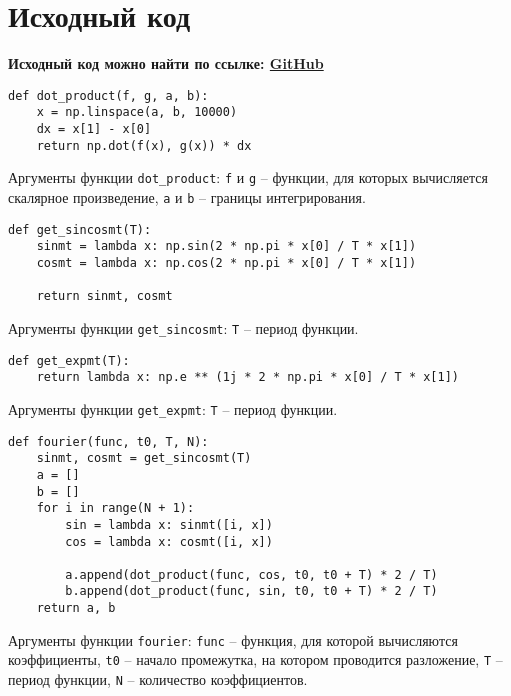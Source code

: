 \section{Исходный код}
\label{appendix:source}

\textbf{Исходный код можно найти по ссылке: \href{https://github.com/edelwiw/Frequency_methods}{GitHub}} 

\begin{lstlisting}[style=python_white, caption=Функция для вычисления скалярного произведения функций, label=lst:dot_product]
def dot_product(f, g, a, b):
    x = np.linspace(a, b, 10000)
    dx = x[1] - x[0]
    return np.dot(f(x), g(x)) * dx
\end{lstlisting}
Аргументы функции \texttt{dot\_product}: \texttt{f} и \texttt{g} -- функции, для которых вычисляется скалярное произведение, \texttt{a} и \texttt{b} -- границы интегрирования.
\newline

\begin{lstlisting}[style=python_white, caption=Функция для получения вспомогательных функций, label=lst:get_sincosmt]
def get_sincosmt(T):
    sinmt = lambda x: np.sin(2 * np.pi * x[0] / T * x[1])
    cosmt = lambda x: np.cos(2 * np.pi * x[0] / T * x[1])

    return sinmt, cosmt
\end{lstlisting}
Аргументы функции \texttt{get\_sincosmt}: \texttt{T} -- период функции.
\newline

\begin{lstlisting}[style=python_white, caption=Функция для получения вспомогательных функций, label=lst:get_expmt]
def get_expmt(T):
    return lambda x: np.e ** (1j * 2 * np.pi * x[0] / T * x[1])
\end{lstlisting}
Аргументы функции \texttt{get\_expmt}: \texttt{T} -- период функции.
\newline


\begin{lstlisting}[style=python_white, caption=Функция для вычисления коэффициентов Фурье, label=lst:fourier]
def fourier(func, t0, T, N):
    sinmt, cosmt = get_sincosmt(T)
    a = []
    b = []
    for i in range(N + 1):
        sin = lambda x: sinmt([i, x])
        cos = lambda x: cosmt([i, x])

        a.append(dot_product(func, cos, t0, t0 + T) * 2 / T)
        b.append(dot_product(func, sin, t0, t0 + T) * 2 / T)
    return a, b
\end{lstlisting}
Аргументы функции \texttt{fourier}: \texttt{func} -- функция, для которой вычисляются коэффициенты, \texttt{t0} -- начало промежутка, на котором проводится разложение, \texttt{T} -- период функции, \texttt{N} -- количество коэффициентов.
\newline


